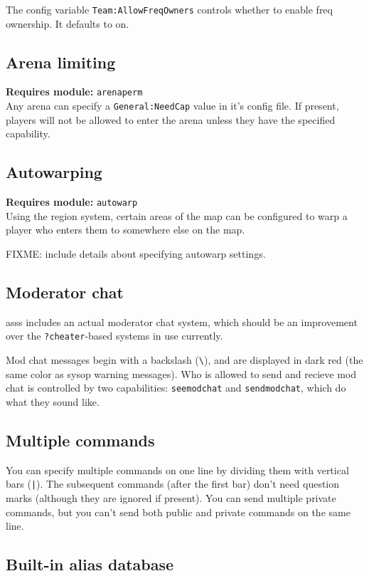 \documentclass{article}
\newcommand{\requiremod}[1]{\noindent\textbf{Requires module:} \texttt{#1}\\}
\newcommand{\asss}{asss}
\begin{document}
The config variable \texttt{Team:AllowFreqOwners} controls whether to
enable freq ownership. It defaults to on.

\subsection{Arena limiting}

\requiremod{arenaperm}
Any arena can specify a \texttt{General:NeedCap} value in it's config
file. If present, players will not be allowed to enter the arena unless
they have the specified capability.


\subsection{Autowarping}

\requiremod{autowarp}
Using the region system, certain areas of the map can be configured to
warp a player who enters them to somewhere else on the map.

FIXME: include details about specifying autowarp settings.


\subsection{Moderator chat}

\asss{} includes an actual moderator chat system, which should be an
improvement over the \verb/?cheater/-based systems in use currently.

Mod chat messages begin with a backslash (\verb/\/), and are displayed
in dark red (the same color as sysop warning messages). Who is allowed
to send and recieve mod chat is controlled by two capabilities:
\texttt{seemodchat} and \texttt{sendmodchat}, which do what they sound
like.


\subsection{Multiple commands}

You can specify multiple commands on one line by dividing them with
vertical bars (\verb/|/). The subsequent commands (after the first bar)
don't need question marks (although they are ignored if present). You
can send multiple private commands, but you can't send both public and
private commands on the same line.


\subsection{Built-in alias database}
\end{document}
